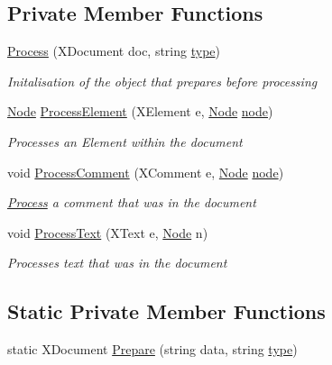 \subsection*{Private Member Functions}
\begin{DoxyCompactItemize}
\item 
\hyperlink{class_web_server_1_1_process_acaf397891f58f68bf8e1704f9fc8a8b0}{Process} (X\+Document doc, string \hyperlink{class_web_server_1_1_process_ae8a1513688e4d9e54294cff90728ea91}{type})
\begin{DoxyCompactList}\small\item\em Initalisation of the object that prepares before processing \end{DoxyCompactList}\item 
\hyperlink{class_web_server_1_1_node}{Node} \hyperlink{class_web_server_1_1_process_ac7600e6ea07887aeb2f23f4e0a5dd01a}{Process\+Element} (X\+Element e, \hyperlink{class_web_server_1_1_node}{Node} \hyperlink{class_web_server_1_1_process_ae62fa93d1a1f981b11418b620bee89d9}{node})
\begin{DoxyCompactList}\small\item\em Processes an Element within the document \end{DoxyCompactList}\item 
void \hyperlink{class_web_server_1_1_process_a556b06df908a3a180ffa037846aaa1a6}{Process\+Comment} (X\+Comment e, \hyperlink{class_web_server_1_1_node}{Node} \hyperlink{class_web_server_1_1_process_ae62fa93d1a1f981b11418b620bee89d9}{node})
\begin{DoxyCompactList}\small\item\em \hyperlink{class_web_server_1_1_process}{Process} a comment that was in the document \end{DoxyCompactList}\item 
void \hyperlink{class_web_server_1_1_process_a8e79c8d25eca802ac7e09bba030cd2e2}{Process\+Text} (X\+Text e, \hyperlink{class_web_server_1_1_node}{Node} n)
\begin{DoxyCompactList}\small\item\em Processes text that was in the document \end{DoxyCompactList}\end{DoxyCompactItemize}
\subsection*{Static Private Member Functions}
\begin{DoxyCompactItemize}
\item 
static X\+Document \hyperlink{class_web_server_1_1_process_a3cd5a133e4c79d58f8a5d4c400614986}{Prepare} (string data, string \hyperlink{class_web_server_1_1_process_ae8a1513688e4d9e54294cff90728ea91}{type})
\end{DoxyCompactItemize}
